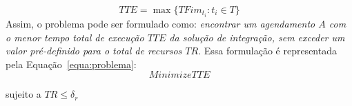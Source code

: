 \begin{equation}
TTE = \max \{ TFi{m_{{t_i}}}:{t_i} \in T\} 
\label{equa:tempo-total-execução}
\end{equation}
Assim, o problema pode ser formulado como: \textit{encontrar um agendamento $A$ com o menor tempo total de execução $TTE$ da solução de integração, sem exceder um valor pré-definido para o total de recursos $TR$}. Essa formulação é representada pela Equação~\ref{equa:problema}:
\begin{equation}
Minimize {TTE} 
\label{equa:problema}
\end{equation}
\begin{center}
	 sujeito a ${TR \le {\delta _r}} $
\end{center}
